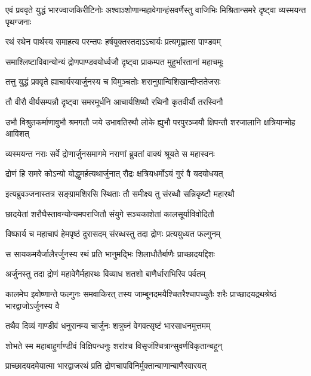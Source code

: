\onelineshloka
{एवं प्रववृते युद्धं भारज्वाजकिरीटिनोः}
\twolineshloka
{अश्वाञ्शोणान्महावेगान्हंसवर्णैस्तु वाजिभिः}
{मिश्रितान्समरे दृष्ट्वा व्यस्मयन्त पृथग्जनाः}


\twolineshloka
{रथं रथेन पार्थस्य समाहत्य परन्तपः}
{हर्षयुक्तस्तदाऽऽचार्यः प्रत्यगृह्णात्स पाण्डवम्}


\twolineshloka
{समाश्लिष्टाविवान्योन्यं द्रोणपाण्डवयोर्ध्वजौ}
{दृष्ट्वा प्राकम्पत मुहुर्भारतानां महाचमूः}


\twolineshloka
{तत्तु युद्धं प्रववृते ह्याचार्यस्यार्जुनस्य च}
{विमुञ्चतोः शरानुग्रान्विशिखान्दीप्ततेजसः}


\twolineshloka
{तौ वीरौ वीर्यसम्पन्नौ दृष्ट्वा समरमूर्धनि}
{आचार्यशिष्यौ रथिनौ कृतवीर्यौ तरस्विनौ}


\threelineshloka
{उभौ विश्रुतकर्माणावुभौ श्रमगतौ जये}
{उभावतिरथौ लोके ह्युभौ परपुरञ्जयौ}
{क्षिपन्तौ शरजालानि क्षत्रियान्मोह आविशत्}


\twolineshloka
{व्यस्मयन्त नराः सर्वे द्रोणार्जुनसमागमे}
{नराणां ब्रुवतां वाक्यं श्रूयते स महास्वनः}


\twolineshloka
{द्रोणं हि समरे कोऽन्यो योद्धुमर्हत्यथार्जुनात्}
{रौद्रः क्षत्रियधर्मोऽयं गुरं वै यदयोधयत्}


\twolineshloka
{इत्यब्रुवञ्जनास्तत्र सङ्ग्रामशिरसि स्थिताः}
{तौ समीक्ष्य तु संरब्धौ सन्निकृष्टौ महारथौ}


\twolineshloka
{छादयेतां शरौघैस्तावन्योन्यमपराजितौ}
{संयुगे सञ्चकाशेतां कालसूर्याविवोदितौ}


\twolineshloka
{विष्फार्य च महाचापं हेमपृष्ठं दुरासदम्}
{संरब्धस्तु तदा द्रोणः प्रत्ययुध्यत फल्गुनम्}


\twolineshloka
{स सायकमयैर्जालैरर्जुनस्य रथं प्रति}
{भानुमद्भिः शिलाधौतैर्बाणैः प्राच्छादयद्दिशः}


\twolineshloka
{अर्जुनस्तु तदा द्रोणं महावेगैर्महारथः}
{विव्याध शतशो बाणैर्धाराभिरिव पर्वतम्}


\onelineshloka
{कालमेघ इवोष्णान्ते फल्गुनः समवाकिरत्}
\twolineshloka
{तस्य जाम्बूनदमयैश्चितरैश्चापच्युतैः शरैः}
{प्राच्छादयद्रथश्रेष्ठं भारद्वाजोऽर्जुनस्य वै}


\twolineshloka
{तथैव दिव्यं गाण्डीवं धनुरानम्य चार्जुनः}
{शत्रुघ्नं वेगवत्सृष्टं भारसाधनमुत्तमम्}


\twolineshloka
{शोभते स्म महाबाहुर्गाण्डीवं विक्षिपन्धनुः}
{शरांश्च विसृजंश्चित्रान्सुवर्णविकृतान्बहून्}


\twolineshloka
{प्राच्छादयदमेयात्मा भारद्वाजरथं प्रति}
{द्रोणचापविनिर्मुक्तान्बाणान्बाणैरवारयत्}



